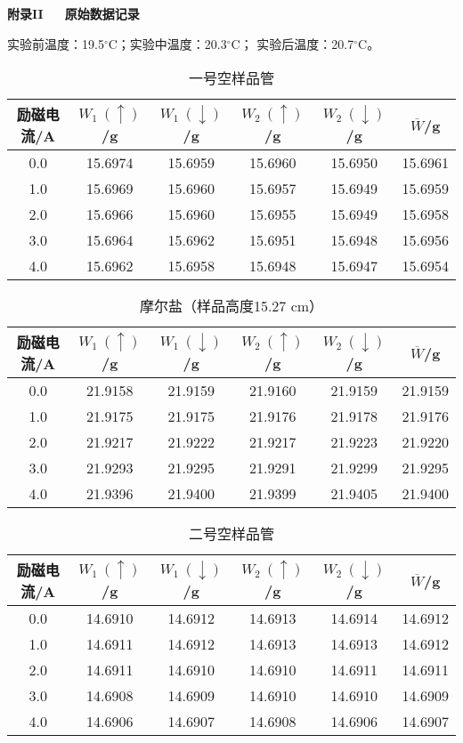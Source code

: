 \documentclass[12pt]{ctexart}
\numberwithin{equation}{section}
\begin{document}
\newpage
\begin{center}
    \Large\bfseries{附录II~~~原始数据记录}
\end{center}

实验前温度：19.5$^\circ$C；实验中温度：20.3$^\circ$C；
实验后温度：20.7$^\circ$C。

\begin{longtable}{cccccc}
    \caption{一号空样品管} \\
    \hline
    励磁电流/A & $W_1~(\uparrow)$/g & $W_1~(\downarrow)$/g &
    $W_2~(\uparrow)$/g & $W_2~(\downarrow)$/g &
    $\overline{W}$/g \\
    \hline
    0.0 & 15.6974 & 15.6959 & 15.6960 & 15.6950 & 15.6961 \\
    1.0 & 15.6969 & 15.6960 & 15.6957 & 15.6949 & 15.6959 \\
    2.0 & 15.6966 & 15.6960 & 15.6955 & 15.6949 & 15.6958 \\
    3.0 & 15.6964 & 15.6962 & 15.6951 & 15.6948 & 15.6956 \\
    4.0 & 15.6962 & 15.6958 & 15.6948 & 15.6947 & 15.6954 \\
    \hline
\end{longtable}

\begin{longtable}{cccccc}
    \caption{摩尔盐（样品高度15.27 cm）} \\
    \hline
    励磁电流/A & $W_1~(\uparrow)$/g & $W_1~(\downarrow)$/g &
    $W_2~(\uparrow)$/g & $W_2~(\downarrow)$/g &
    $\overline{W}$/g \\
    \hline
    0.0 & 21.9158 & 21.9159 & 21.9160 & 21.9159 & 21.9159 \\
    1.0 & 21.9175 & 21.9175 & 21.9176 & 21.9178 & 21.9176 \\
    2.0 & 21.9217 & 21.9222 & 21.9217 & 21.9223 & 21.9220 \\
    3.0 & 21.9293 & 21.9295 & 21.9291 & 21.9299 & 21.9295 \\
    4.0 & 21.9396 & 21.9400 & 21.9399 & 21.9405 & 21.9400 \\
    \hline
\end{longtable}

\begin{longtable}{cccccc}
    \caption{二号空样品管} \\
    \hline
    励磁电流/A & $W_1~(\uparrow)$/g & $W_1~(\downarrow)$/g &
    $W_2~(\uparrow)$/g & $W_2~(\downarrow)$/g &
    $\overline{W}$/g \\
    \hline
    0.0 & 14.6910 & 14.6912 & 14.6913 & 14.6914 & 14.6912 \\
    1.0 & 14.6911 & 14.6912 & 14.6913 & 14.6913 & 14.6912 \\
    2.0 & 14.6911 & 14.6910 & 14.6910 & 14.6911 & 14.6911 \\
    3.0 & 14.6908 & 14.6909 & 14.6910 & 14.6910 & 14.6909 \\
    4.0 & 14.6906 & 14.6907 & 14.6908 & 14.6906 & 14.6907 \\
    \hline
\end{longtable}
\end{document}
